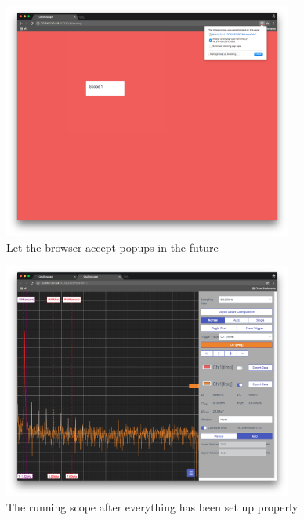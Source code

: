 \begin{figure}
    \centering
    \includegraphics[width=0.85\textwidth]{images/userguide/popup_yes}
    \caption[Accept popups in the future]{%
        Let the browser accept popups in the future%
    }
    \label{fig:userguide:popup:yes}
\end{figure}

\begin{figure}
    \centering
    \includegraphics[width=0.85\textwidth]{images/userguide/running}
    \caption[Running the scope]{%
        The running scope after everything has been set up properly%
    }
    \label{fig:userguide:running}
\end{figure}

%
%
